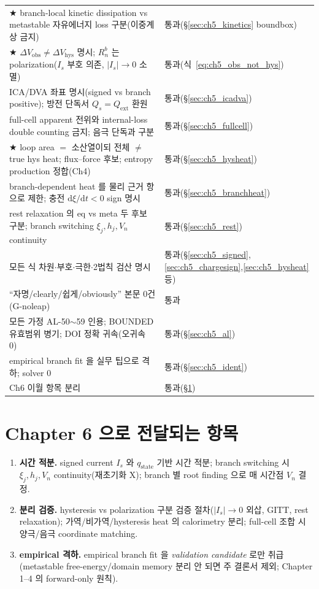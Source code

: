 \documentclass[11pt,a4paper]{article}
\newcommand{\dd}{\mathrm{d}}
\newcommand{\ext}{\mathrm{ext}}
\newcommand{\hys}{\mathrm{hys}}
\newcommand{\obs}{\mathrm{obs}}
\newcommand{\stt}{\mathrm{state}}
\begin{document}
{\begin{longtable}{>{\raggedright\arraybackslash}p{} >{\raggedright\arraybackslash}p{}}
★ branch-local kinetic dissipation vs metastable 자유에너지 loss 구분(이중계상 금지) & 통과(\S\ref{sec:ch5_kinetics} boundbox) \\
★ $\Delta V_\obs\ne\Delta V_\hys$ 명시; $R_n^b$ 는 polarization($I_s$ 부호 의존, $|I_s|{\to}0$ 소멸) & 통과(식~\eqref{eq:ch5_obs_not_hys}) \\
ICA/DVA 좌표 명시(signed vs branch positive); 방전 단독서 $Q_s{=}Q_\ext$ 환원 & 통과(\S\ref{sec:ch5_icadva}) \\
full-cell apparent 전위와 internal-loss double counting 금지; 음극 단독과 구분 & 통과(\S\ref{sec:ch5_fullcell}) \\
★ loop area $=$ 소산열이되 전체 $\ne$ true hys heat; flux--force 후보; entropy production 정합(Ch4) & 통과(\S\ref{sec:ch5_hysheat}) \\
branch-dependent heat 를 물리 근거 항으로 제한; 충전 $\dd\xi/\dd t<0$ sign 명시 & 통과(\S\ref{sec:ch5_branchheat}) \\
rest relaxation 의 eq vs meta 두 후보 구분; branch switching $\xi_j,h_j,V_n$ continuity & 통과(\S\ref{sec:ch5_rest}) \\
모든 식 차원$\cdot$부호$\cdot$극한$\cdot$2법칙 검산 명시 & 통과(\S\ref{sec:ch5_signed},\ref{sec:ch5_chargesign},\ref{sec:ch5_hysheat} 등) \\
``자명/clearly/쉽게/obviously'' 본문 0건(G-noleap) & 통과 \\
모든 가정 AL-50$\sim$59 인용; BOUNDED 유효범위 병기; DOI 정확 귀속(오귀속 0) & 통과(\S\ref{sec:ch5_al}) \\
empirical branch fit 을 실무 팁으로 격하; solver 0 & 통과(\S\ref{sec:ch5_ident}) \\
Ch6 이월 항목 분리 & 통과(\S\ref{sec:ch5_transmit}) \\
\bottomrule
\end{longtable}
}

\section{Chapter 6 으로 전달되는 항목}\label{sec:ch5_transmit}
\begin{enumerate}[label=\arabic*),leftmargin=2.0em]
\item \textbf{시간 적분.} signed current $I_s$ 와 $q_\stt$ 기반 시간 적분; branch switching 시 $\xi_j,h_j,V_n$
  continuity(재초기화 X); branch 별 root finding 으로 매 시간점 $V_n$ 결정.
\item \textbf{분리 검증.} hysteresis vs polarization 구분 검증 절차($|I_s|\to0$ 외삽, GITT, rest relaxation);
  가역/비가역/hysteresis heat 의 calorimetry 분리; full-cell 조합 시 양극/음극 coordinate matching.
\item \textbf{empirical 격하.} empirical branch fit 을 \emph{validation candidate} 로만 취급(metastable
  free-energy/domain memory 분리 안 되면 주 결론서 제외; Chapter 1--4 의 forward-only 원칙).
\end{enumerate}
\end{document}
